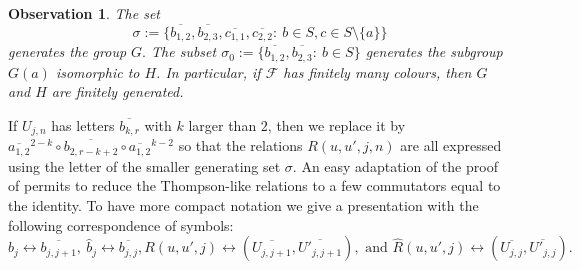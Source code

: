 \documentclass[a4paper, 12pt]{amsart}
\numberwithin{equation}{section}
\newtheorem{observation}[theorem]{Observation}
\theoremstyle{definition}
\newcommand{\cF}{\mathcal F}
\newcommand{\ov}{\overline}
\newcommand{\wh}{\widehat}
\begin{document}
\begin{observation} 
The set
$$\sigma:=\{ \ov{b_{1,2}}, \ov{b_{2,3}}, \ov{c_{1,1}}, \ov{c_{2,2}}:\ b\in S, c\in S\setminus\{a\}\}$$ generates the group $G.$
The subset $\sigma_0:=\{\ov{b_{1,2}}, \ov{b_{2,3}}: \ b\in S\}$ generates the subgroup $G(a)$ isomorphic to $H$.
In particular, if $\cF$ has finitely many colours, then $G$ and $H$ are finitely generated.
\end{observation}

If $U_{j,n}$ has letters $\ov{b_{k,r}}$ with $k$ larger than $2$, then we replace it by $\ov{a_{1,2}}^{2-k} \circ \ov{b_{2,r-k+2}}\circ \ov{a_{1,2}}^{k-2}$ so that the relations $R(u,u',j,n)$ are all expressed using the letter of the smaller generating set $\sigma$.
An easy adaptation of the proof of \cite[Section 3]{Cannon-Floyd-Parry96} permits to reduce the Thompson-like relations to a few commutators equal to the identity.
To have more compact notation we give a presentation with the following correspondence of symbols:
$$b_j\leftrightarrow \ov{b_{j,j+1}},\ \wh b_j\leftrightarrow \ov{b_{j,j}}
, R(u,u',j)\leftrightarrow (\ov{U_{j,j+1} },\ov{U'_{j,j+1} }), \text{ and } \wh R(u,u',j)\leftrightarrow (\ov{U_{j,j} },\ov{U'_{j,j} }).$$
\end{document}
